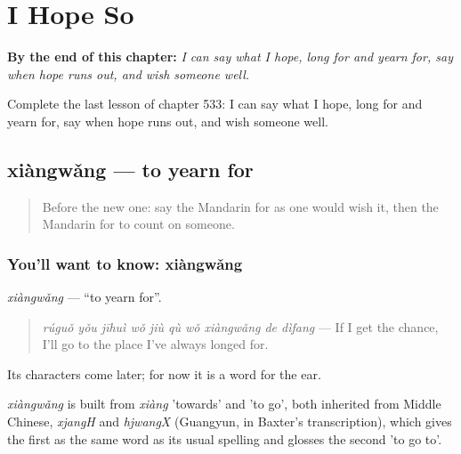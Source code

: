 
\chapter{I Hope So}
\label{ch:zh-i-hope-so}

\begin{chapteropening}
\textbf{By the end of this chapter:} \emph{I can say what I hope, long for and yearn for, say when hope runs out, and wish someone well.}

Complete the last lesson of chapter 533: I can say what I hope, long for and yearn for, say when hope runs out, and wish someone well.
\end{chapteropening}

\section[xiàngwǎng]{xiàngwǎng — to yearn for}

\label{lesson:ZH-C533-xiangwang}



\begin{quote}
Before the new one: say the Mandarin for as one would wish it, then the Mandarin for to count on someone.
\end{quote}

\subsection*{You'll want to know: xiàngwǎng}
\emph{xiàngwǎng} — \textquotedblleft{}to yearn for\textquotedblright{}.

\begin{quote}
\emph{rúguǒ yǒu jīhuì wǒ jiù qù wǒ xiàngwǎng de dìfang} — If I get the chance, I'll go to the place I've always longed for.
\end{quote}

Its characters come later; for now it is a word for the ear.

\begin{cousinweb}
\emph{xiàngwǎng} is built from \emph{xiàng} 'towards' and  'to go', both inherited from Middle Chinese, \emph{xjangH} and \emph{hjwangX} (Guangyun, in Baxter's transcription), which gives the first as the same word as its usual spelling and glosses the second 'to go to'.
\end{cousinweb}

